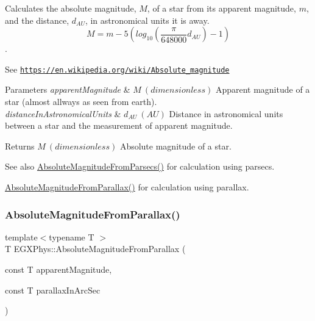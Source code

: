 Calculates the absolute magnitude, $M$, of a star from its apparent magnitude, $m$, and the distance, $d_{AU}$, in astronomical units it is away. \[M= m - 5 \left ( log_{10} \left ( \dfrac{\pi}{648000}d_{AU} \right ) - 1 \right )\]. 

See \href{https://en.wikipedia.org/wiki/Absolute_magnitude}{\tt https\+://en.\+wikipedia.\+org/wiki/\+Absolute\+\_\+magnitude}


\begin{DoxyParams}{Parameters}
{\em apparent\+Magnitude} & $M\ (dimensionless)$ Apparent magnitude of a star (almost allways as seen from earth). \\
\hline
{\em distance\+In\+Astronomical\+Units} & $d_{AU}\ (AU)$ Distance in astronomical units between a star and the measurement of apparent magnitude. \\
\hline
\end{DoxyParams}
\begin{DoxyReturn}{Returns}
$M\ (dimensionless)$ Absolute magnitude of a star. 
\end{DoxyReturn}
\begin{DoxySeeAlso}{See also}
\mbox{\hyperlink{group___e_g_x_phys-_astrophysics-_absolute_magnitude_ga6eb3d93ce8d6ff1e0cc288059225ff9a}{Absolute\+Magnitude\+From\+Parsecs()}} for calculation using parsecs. 

\mbox{\hyperlink{group___e_g_x_phys-_astrophysics-_absolute_magnitude_ga057faec7c22e76e31ad65bf2f98e0d58}{Absolute\+Magnitude\+From\+Parallax()}} for calculation using parallax. 
\end{DoxySeeAlso}
\mbox{\label{group___e_g_x_phys-_astrophysics-_absolute_magnitude_ga057faec7c22e76e31ad65bf2f98e0d58}} 
\subsubsection{\texorpdfstring{Absolute\+Magnitude\+From\+Parallax()}{AbsoluteMagnitudeFromParallax()}}
{\footnotesize\ttfamily template$<$typename T $>$ \\
T E\+G\+X\+Phys\+::\+Absolute\+Magnitude\+From\+Parallax (\begin{DoxyParamCaption}\item[{const T}]{apparent\+Magnitude,  }\item[{const T}]{parallax\+In\+Arc\+Sec }\end{DoxyParamCaption})}



